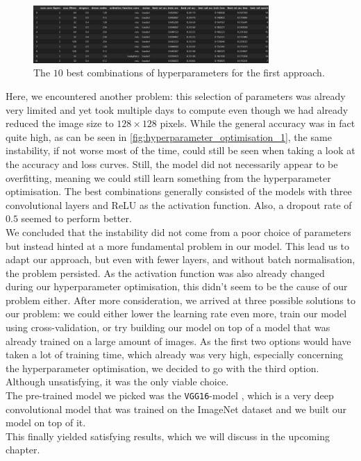 \begin{figure}[H]
    \centering
    \includegraphics[width=0.8\textwidth]{images/hyperparameter_optimisation_1.png}
    \caption{The $10$ best combinations of hyperparameters for the first approach.}
    \label{fig:hyperparameter_optimisation_1}
\end{figure}

Here, we encountered another problem: this selection of parameters was already very limited and yet took multiple days to compute even though we
had already reduced the image size to $128 \times 128$ pixels.
While the general accuracy was in fact quite high, as can be seen in \autoref{fig:hyperparameter_optimisation_1},
the same instability, if not worse most of the time, could still be seen when taking a look at the accuracy and loss curves.
Still, the model did not necessarily appear to be overfitting, meaning we could still learn something from the hyperparameter optimisation.
The best combinations generally consisted of the models with three convolutional layers and ReLU as the activation function.
Also, a dropout rate of $0.5$ seemed to perform better. \\

We concluded that the instability did not come from a poor choice of parameters but instead hinted at a more fundamental problem in our model.
This lead us to adapt our approach, but even with fewer layers, and without batch normalisation, the problem persisted.
As the activation function was also already changed during our hyperparameter optimisation, this didn't seem to be the cause of our problem either.
After more consideration, we arrived at three possible solutions to our problem: we could either lower the learning rate even more, train our model using cross-validation,
or try building our model on top of a model that was already trained on a large amount of images.
As the first two options would have taken a lot of training time, which already was very high, especially concerning the hyperparameter optimisation,
we decided to go with the third option.
Although unsatisfying, it was the only viable choice. \\

The pre-trained model we picked was the \texttt{VGG16}-model \cite{VGG16source}, which is a very deep convolutional model that was trained on the ImageNet dataset
and we built our model on top of it. \\

This finally yielded satisfying results, which we will discuss in the upcoming chapter.

